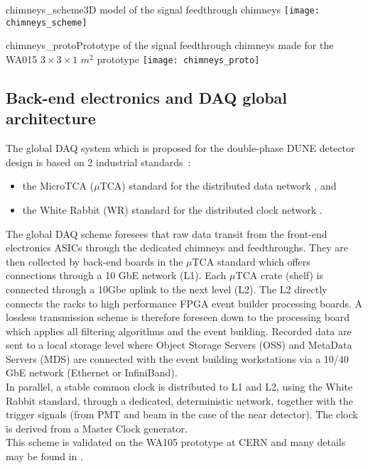 \begin{cdrfigure}{chimneys_scheme}{3D model of the signal feedthrough chimneys}
\texttt{[image: chimneys\_scheme]}
\end{cdrfigure}


\begin{cdrfigure}{chimneys_proto}{Prototype of the signal feedthrough chimneys made for the WA015 $3\times3\times 1$ $m^2$ prototype}
\texttt{[image: chimneys\_proto]}
\end{cdrfigure}

\subsection{Back-end electronics and DAQ global architecture}

The global DAQ system which is proposed for the double-phase DUNE detector design is based on 2 industrial standards~:

\begin{itemize}
\item the MicroTCA ($\mu$TCA) standard for the distributed data network \cite{mTCA-standard}, and
\item the White Rabbit (WR) standard for the distributed clock network \cite{WR-standard}.
\end{itemize}

The global DAQ scheme foresees that raw data transit from the front-end electronics ASICs through the dedicated chimneys and feedthroughs. They are then collected by back-end boards in the $\mu$TCA standard which offers connections through a 10 GbE network (L1). Each $\mu$TCA crate (shelf) is connected through a 10Gbe uplink to the next level (L2). The L2 directly connects the racks to high performance FPGA event builder processing boards. A lossless transmission scheme is therefore foreseen down to the processing board which applies all filtering algorithms and the event building. Recorded data are sent to a local storage level where Object Storage Servers (OSS) and MetaData Servers (MDS) are connected with the event building workstations via a 10/40 GbE network (Ethernet or InfiniBand).\\ 

In parallel, a stable common clock is distributed to L1 and L2, using the White Rabbit standard, through a dedicated, deterministic network, together with the trigger signals (from PMT and beam in the case of the near detector). The clock is derived from a Master Clock generator.\\
This scheme is validated on the WA105 prototype at CERN and many details may be found in \cite{WA105_TDR}.  

